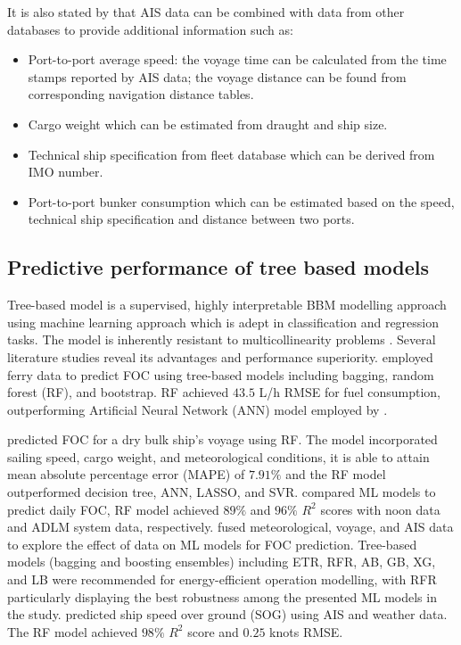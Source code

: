\documentclass[]{interact}
\theoremstyle{plain}%
\theoremstyle{definition}
\theoremstyle{remark}
\begin{document}
It is also stated by \citet{Yang.2019} that AIS data can be combined with data from other databases to provide additional information such as:

\begin{itemize}
    \setlength\itemsep{0em}
    \item Port-to-port average speed: the voyage time can be calculated from the time stamps reported by AIS data; the voyage distance can be found from corresponding navigation distance tables.
    \item Cargo weight which can be estimated from draught and ship size.
    \item Technical ship specification from fleet database which can be derived from IMO number.
    \item Port-to-port bunker consumption which can be estimated based on the speed, technical ship specification and distance between two ports.
\end{itemize}

\subsection{Predictive performance of tree based models}\label{sec:perf_tree_litreview}

Tree-based model is a supervised, highly interpretable BBM modelling approach using machine learning approach which is adept in classification and regression tasks. The model is inherently resistant to multicollinearity problems \citep{Yan.2021}.  Several literature studies reveal its advantages and performance superiority. \citet{Soner.2018} employed ferry data to predict FOC using tree-based models including bagging, random forest (RF), and bootstrap. RF achieved $43.5$ L/h RMSE for fuel consumption, outperforming Artificial Neural Network (ANN) model employed by \citet{Petersen.2012}.

\citet{Yan.2020} predicted FOC for a dry bulk ship's voyage using RF. The model incorporated sailing speed, cargo weight, and meteorological conditions, it is able to attain mean absolute percentage error (MAPE) of $7.91\%$ and the RF model outperformed decision tree, ANN, LASSO, and SVR. \citet{Gkerekos.2019} compared ML models to predict daily FOC, RF model achieved $89\%$ and $96\%$ $R^2$ scores with noon data and ADLM system data, respectively. \citet{Li.2022} fused meteorological, voyage, and AIS data to explore the effect of data on ML models for FOC prediction. Tree-based models (bagging and boosting ensembles) including ETR, RFR, AB, GB, XG, and LB were recommended for energy-efficient operation modelling, with RFR particularly displaying the best robustness among the presented ML models in the study. \citet{Abebe.2020} predicted ship speed over ground (SOG) using AIS and weather data. The RF model achieved $98\%$ $R^2$ score and $0.25$ knots RMSE.
\end{document}
